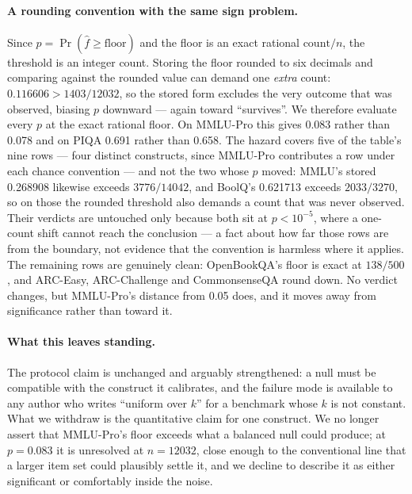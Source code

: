 \paragraph{A rounding convention with the same sign problem.} Since $p=\Pr(\hat f\ge\text{floor})$ and the floor is an exact rational $\text{count}/n$, the threshold is an integer count. Storing the floor rounded to six decimals and comparing against the rounded value can demand one \emph{extra} count: $0.116606>1403/12032$, so the stored form excludes the very outcome that was observed, biasing $p$ downward --- again toward ``survives''. We therefore evaluate every $p$ at the exact rational floor. On MMLU-Pro this gives 0.083 rather than 0.078 and on PIQA 0.691 rather than 0.658. The hazard covers five of the table's nine rows --- four distinct constructs, since MMLU-Pro contributes a row under each chance convention --- and not the two whose $p$ moved: MMLU's stored 0.268908 likewise exceeds $3776/14042$, and BoolQ's 0.621713 exceeds $2033/3270$, so on those the rounded threshold also demands a count that was never observed. Their verdicts are untouched only because both sit at $p<10^{-5}$, where a one-count shift cannot reach the conclusion --- a fact about how far those rows are from the boundary, not evidence that the convention is harmless where it applies. The remaining rows are genuinely clean: OpenBookQA's floor is exact at $138/500$, and ARC-Easy, ARC-Challenge and CommonsenseQA round down. No verdict changes, but MMLU-Pro's distance from 0.05 does, and it moves away from significance rather than toward it.

\paragraph{What this leaves standing.} The protocol claim is unchanged and arguably strengthened: a null must be compatible with the construct it calibrates, and the failure mode is available to any author who writes ``uniform over $k$'' for a benchmark whose $k$ is not constant. What we withdraw is the quantitative claim for one construct. We no longer assert that MMLU-Pro's floor exceeds what a balanced null could produce; at $p=0.083$ it is unresolved at $n=12032$, close enough to the conventional line that a larger item set could plausibly settle it, and we decline to describe it as either significant or comfortably inside the noise.




\FloatBarrier
